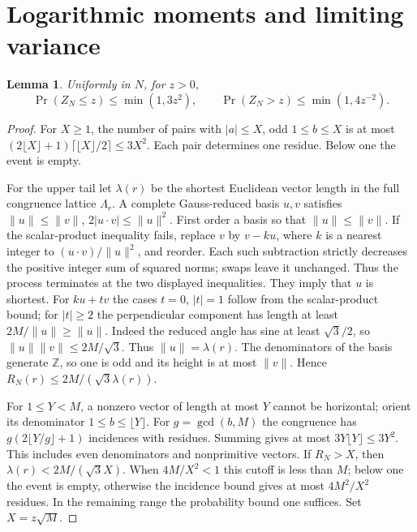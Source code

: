 \documentclass[11pt,a4paper]{article}
\numberwithin{equation}{section}
\newtheorem{lemma}[theorem]{Lemma}
\theoremstyle{remark}
\newcommand{\Z}{\mathbb Z}
\begin{document}
\section{Logarithmic moments and limiting variance}\label{sec:moments}
\begin{lemma}\label{lem:tails}
Uniformly in $N$, for $z>0$,
\[
\Pr(Z_N\le z)\le\min(1,3z^2),\qquad
\Pr(Z_N>z)\le\min(1,4z^{-2}).
\]
\end{lemma}
\begin{proof}
For $X\ge1$, the number of pairs with $|a|\le X$, odd $1\le b\le X$
is at most $(2\lfloor X\rfloor+1)\lceil\lfloor X\rfloor/2\rceil
\le3X^2$. Each pair determines one residue. Below one the event is empty.

For the upper tail let $\lambda(r)$ be the shortest Euclidean vector
length in the full congruence lattice $\Lambda_r$. A complete
Gauss-reduced basis $u,v$ satisfies
$\|u\|\le\|v\|$, $2|u\cdot v|\le\|u\|^2$.
First order a basis so that $\|u\|\le\|v\|$. If the scalar-product
inequality fails, replace $v$ by $v-ku$, where $k$ is a nearest integer
to $(u\cdot v)/\|u\|^2$, and reorder. Each such subtraction strictly
decreases the positive integer sum of squared norms; swaps leave it
unchanged. Thus the process terminates at the two displayed inequalities.
They imply that $u$ is shortest. For $ku+tv$ the
cases $t=0$, $|t|=1$ follow from the scalar-product bound; for
$|t|\ge2$ the perpendicular component has length at least
$2M/\|u\|\ge\|u\|$. Indeed the reduced angle has sine at least
$\sqrt3/2$, so $\|u\|\|v\|\le2M/\sqrt3$.
Thus $\|u\|=\lambda(r)$. The denominators of the basis generate
$\Z$, so one is odd and its height is at most $\|v\|$. Hence
$R_N(r)\le2M/(\sqrt3\lambda(r))$.

For $1\le Y<M$, a nonzero vector of length at most $Y$ cannot be
horizontal; orient its denominator $1\le b\le\lfloor Y\rfloor$.
For $g=\gcd(b,M)$ the congruence has
$g(2\lfloor Y/g\rfloor+1)$ incidences with residues. Summing gives
at most $3Y\lfloor Y\rfloor\le3Y^2$. This includes even denominators
and nonprimitive vectors. If $R_N>X$, then
$\lambda(r)<2M/(\sqrt3X)$. When $4M/X^2<1$ this cutoff is less
than $M$; below one the event is empty, otherwise the incidence bound
gives at most $4M^2/X^2$ residues. In the remaining range the
probability bound one suffices. Set $X=z\sqrt M$.
\end{proof}
\end{document}
